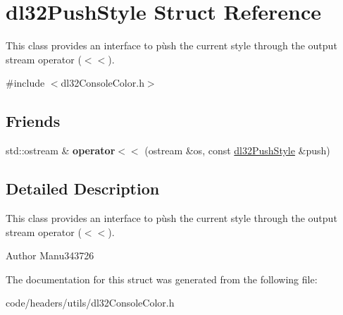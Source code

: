 \hypertarget{structdl32_push_style}{\section{dl32\-Push\-Style Struct Reference}
\label{structdl32_push_style}
}


This class provides an interface to pùsh the current style through the output stream operator ($<$$<$).  




{\ttfamily \#include $<$dl32\-Console\-Color.\-h$>$}

\subsection*{Friends}
\begin{DoxyCompactItemize}
\item 
\hypertarget{structdl32_push_style_a04c0fc3f00523a8fe203d481394142ed}{std\-::ostream \& {\bfseries operator$<$$<$} (ostream \&os, const \hyperlink{structdl32_push_style}{dl32\-Push\-Style} \&push)}\label{structdl32_push_style_a04c0fc3f00523a8fe203d481394142ed}

\end{DoxyCompactItemize}


\subsection{Detailed Description}
This class provides an interface to pùsh the current style through the output stream operator ($<$$<$). 

\begin{DoxyAuthor}{Author}
Manu343726 
\end{DoxyAuthor}


The documentation for this struct was generated from the following file\-:\begin{DoxyCompactItemize}
\item 
code/headers/utils/dl32\-Console\-Color.\-h\end{DoxyCompactItemize}

